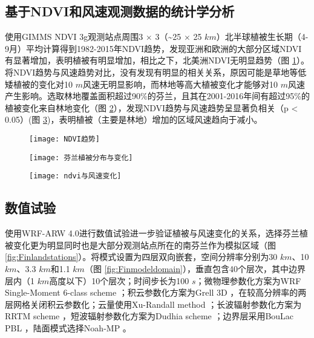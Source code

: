 \subsection{基于NDVI和风速观测数据的统计学分析}

使用GIMMS NDVI 3g观测站点周围3 $ \times$ 3（\textasciitilde 25 $\times$ 25 $km$）北半球植被生长期（4-9月）平均计算得到1982-2015年NDVI趋势，发现亚洲和欧洲的大部分区域NDVI有显著增加，表明植被有明显增加，相比之下，北美洲NDVI无明显趋势（图 \ref{fig:NDVItrend}）。将NDVI趋势与风速趋势对比，没有发现有明显的相关关系，原因可能是草地等低矮植被的变化对10 $m$风速无明显影响，而林地等高大植被变化才能够对10 $m$风速产生影响。选取林地覆盖面积超过90\%的芬兰，且其在2001-2016年间有超过95\%的植被变化来自林地变化（图 \ref{fig:Finlandvegetation}），发现NDVI趋势与风速趋势呈显著负相关（p < 0.05）(图 \ref{fig:FinlandwindvsNDVI})，表明植被（主要是林地）增加的区域风速趋向于减小。

\begin{figure}[!htbp]
    \centering
    \texttt{[image: NDVI趋势]}
        \label{fig:NDVItrend}
\end{figure}

\begin{figure}[!htbp]
    \centering
    \texttt{[image: 芬兰植被分布与变化]}
        \label{fig:Finlandvegetation}
\end{figure}

\begin{figure}[!t]
    \centering
    \texttt{[image: ndvi与风速变化]}
        \label{fig:FinlandwindvsNDVI}
\end{figure}

\subsection{数值试验}

使用WRF-ARW 4.0进行数值试验进一步验证植被与风速变化的关系，选择芬兰植被变化更为明显同时也是大部分观测站点所在的南芬兰作为模拟区域（图 \ref{fig:Finlandstations}）。将模式设置为四层双向嵌套，空间分辨率分别为30 $km$、10 $km$、3.3 $km$和1.1 $km$（图 \ref{fig:Finmodeldomain}），垂直包含40个层次，其中边界层内（1 $km$高度以下）10个层次；时间步长为100 $s$；微物理参数化方案为WRF Single-Moment 6-class scheme \citep{hong2006the}；积云参数化方案为Grell 3D \citep{grell1993prognostic, grell2002a}，在较高分辨率的两层网格关闭积云参数化；云量使用Xu-Randall method \citep{xu1996a}；长波辐射参数化方案为RRTM scheme \citep{mlawer1997radiative}，短波辐射参数化方案为Dudhia scheme \citep{dudhia1989numerical}；边界层采用BouLac PBL \citep{bougeault1989parameterization}，陆面模式选择Noah-MP \citep{niu2011the}。

